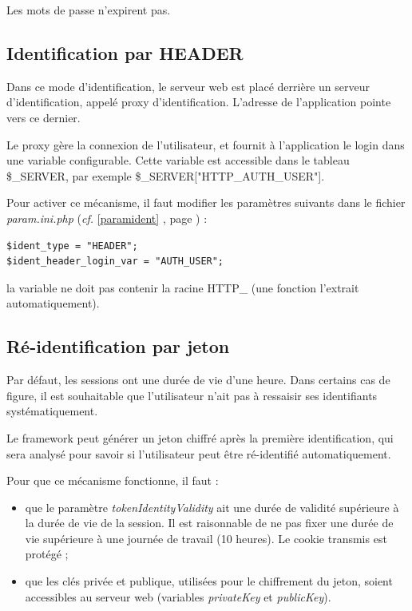 Les mots de passe n'expirent pas.

\subsection{Identification par HEADER}

Dans ce mode d'identification, le serveur web est placé derrière un serveur d'identification, appelé proxy d'identification. L'adresse de l'application pointe vers ce dernier. 

Le proxy gère la connexion de l'utilisateur, et fournit à l'application le login dans une variable configurable. Cette variable est accessible dans le tableau \$\_SERVER, par exemple \$\_SERVER["HTTP\_AUTH\_USER"].

Pour activer ce mécanisme, il faut modifier les paramètres suivants dans le fichier \textit{param.ini.php} (\textit{cf.} \ref{paramident} \textit{}, page \pageref{paramident}) :
\begin{lstlisting}
$ident_type = "HEADER";
$ident_header_login_var = "AUTH_USER";
\end{lstlisting}

la variable ne doit pas contenir la racine HTTP\_ (une fonction l'extrait automatiquement).

\subsection{Ré-identification par jeton}

Par défaut, les sessions ont une durée de vie d'une heure. Dans certains cas de figure, il est souhaitable que l'utilisateur n'ait pas à ressaisir ses identifiants systématiquement.

Le framework peut générer un jeton chiffré après la première identification, qui sera analysé pour savoir si l'utilisateur peut être ré-identifié automatiquement.

Pour que ce mécanisme fonctionne, il faut :
\begin{itemize}
\item que le paramètre \textit{tokenIdentityValidity} ait une durée de validité supérieure à la durée de vie de la session. Il est raisonnable de ne pas fixer une durée de vie supérieure à une journée de travail (10 heures). Le cookie transmis est protégé ;
\item que les clés privée et publique, utilisées pour le chiffrement du jeton, soient accessibles au serveur web (variables \textit{privateKey} et \textit{publicKey}).
\end{itemize}


